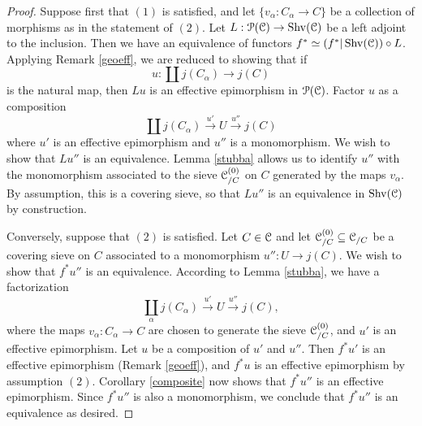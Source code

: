\begin{proof}
Suppose first that $(1)$ is satisfied, and let $\{ v_{\alpha}: C_{\alpha} \rightarrow C\}$ be a collection of morphisms as in the statement of $(2)$. Let $L: \operatorname{\mathcal{P}}(\operatorname{\mathcal{C}}) \rightarrow \operatorname{Shv}(\operatorname{\mathcal{C}})$ be a left adjoint to the inclusion. Then we have an equivalence of functors $f^{\ast} \simeq (f^{\ast}|\operatorname{Shv}(\operatorname{\mathcal{C}})) \circ L$. Applying Remark \ref{geoeff}, we are reduced to showing that if
$$ u: \coprod j(C_{\alpha}) \rightarrow j(C)$$
is the natural map, then $Lu$ is an effective epimorphism in $\operatorname{\mathcal{P}}(\operatorname{\mathcal{C}})$. 
Factor $u$ as a composition
$$ \coprod j(C_{\alpha}) \stackrel{u'}{\rightarrow} U \stackrel{u''}{\rightarrow} j(C)$$
where $u'$ is an effective epimorphism and $u''$ is a monomorphism. We wish to show that
$Lu''$ is an equivalence. Lemma \ref{stubba} allows us to identify $u''$ with the monomorphism
associated to the sieve $\operatorname{\mathcal{C}}^{(0)}_{/C}$ on $C$ generated by the maps $v_{\alpha}$. By assumption, this is a covering sieve, so that $L u''$ is an equivalence in $\operatorname{Shv}(\operatorname{\mathcal{C}})$ by construction.

Conversely, suppose that $(2)$ is satisfied. Let $C \in \operatorname{\mathcal{C}}$ and let $\operatorname{\mathcal{C}}^{(0)}_{/C} \subseteq \operatorname{\mathcal{C}}_{/C}$ be a covering sieve on $C$ associated to a monomorphism
$u'': U \rightarrow j(C)$. We wish to show that $f^{\ast} u''$ is an equivalence.
According to Lemma \ref{stubba}, we have a factorization
$$ \coprod_{\alpha} j(C_{\alpha}) \stackrel{u'}{\rightarrow} U \stackrel{u''}{\rightarrow} j(C), $$
where the maps $v_{\alpha}: C_{\alpha} \rightarrow C$ are chosen to generate the sieve
$\operatorname{\mathcal{C}}^{(0)}_{/C}$, and $u'$ is an effective epimorphism. Let $u$ be a composition of $u'$ and $u''$. Then $f^{\ast} u'$ is an effective epimorphism (Remark \ref{geoeff}), and $f^{\ast} u$ is an effective epimorphism by assumption $(2)$. Corollary \ref{composite} now shows that
$f^{\ast} u''$ is an effective epimorphism. Since $f^{\ast} u''$ is also a monomorphism, we conclude that $f^{\ast} u''$ is an equivalence as desired.
\end{proof}

